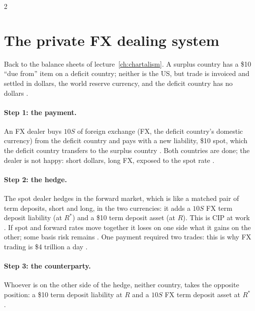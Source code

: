 \begin{paracol}{2}
\section{The private FX dealing system}\label{sec:fx-private}

Back to the balance sheets of lecture~\ref{ch:chartalism}. A surplus country has a \$10 ``due from'' item on a deficit country; neither is the US, but trade is
invoiced and settled in dollars, the world reserve currency, and the deficit country has no dollars .

\paragraph{Step 1: the payment.} An FX dealer buys $10S$ of foreign exchange (FX, the deficit country's domestic currency) from the deficit country and pays with a new
liability, \$10 spot, which the deficit country transfers to the surplus country .
Both countries are done; the dealer is not happy: short dollars, long FX, exposed to the spot rate .

\paragraph{Step 2: the hedge.} The spot dealer hedges in the forward market, which is like a matched pair of term deposits, short and long, in the two currencies:
it adds a $10S$ FX term deposit liability (at $R^\ast$) and a \$10 term deposit asset (at $R$). This is CIP at work
. If spot and forward rates move together it loses on one side what it gains on
the other; some basis risk remains . One payment required two trades: this is why FX trading is \$4 trillion a day .

\paragraph{Step 3: the counterparty.} Whoever is on the other side of the hedge, neither country, takes the opposite position: a \$10 term deposit liability at $R$
and a $10S$ FX term deposit asset at $R^\ast$ .

\begin{nfigure}
\begin{taccts}
\quad
{}\quad
{}
\end{taccts}
\begin{taccts}
\end{taccts}
\caption{The private FX dealing system: one \$10 payment, two dealers .}\label{fig:fx-private}
\end{nfigure}


\end{paracol}

